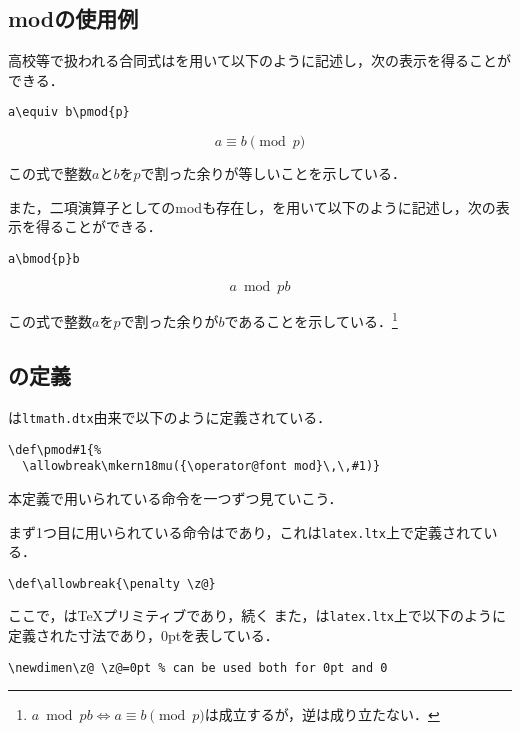 \documentclass[autodetect-engine,dvipdfmx]{jsarticle}
\begin{document}
\subsection{modの使用例}
高校等で扱われる合同式はを用いて以下のように記述し，次の表示を得ることができる．

\texsource
\begin{lstlisting}
a\equiv b\pmod{p}
\end{lstlisting}

\[
a\equiv b\pmod{p}
\]

この式で整数$a$と$b$を$p$で割った余りが等しいことを示している．

また，二項演算子としてのmodも存在し，を用いて以下のように記述し，次の表示を得ることができる．

\begin{lstlisting}
a\bmod{p}b
\end{lstlisting}

\[
a\bmod{p}b
\]

この式で整数$a$を$p$で割った余りが$b$であることを示している．\footnote{$a\bmod{p}b\iff a\equiv b\pmod{p}$は成立するが，逆は成り立たない．}


\subsection{の定義}
は\texttt{ltmath.dtx}由来で以下のように定義されている．

\latexltx
\begin{lstlisting}[firstnumber=4098]
\def\pmod#1{%
  \allowbreak\mkern18mu({\operator@font mod}\,\,#1)}
\end{lstlisting}

本定義で用いられている命令を一つずつ見ていこう．

まず1つ目に用いられている命令はであり，これは\texttt{latex.ltx}上で定義されている．

\begin{lstlisting}[firstnumber=470]
\def\allowbreak{\penalty \z@}
\end{lstlisting}

ここで，は\TeX プリミティブであり，続く
また，は\texttt{latex.ltx}上で以下のように定義された寸法であり，0ptを表している．

\begin{lstlisting}[firstnumber=354]
\newdimen\z@ \z@=0pt % can be used both for 0pt and 0
\end{lstlisting}
\end{document}
